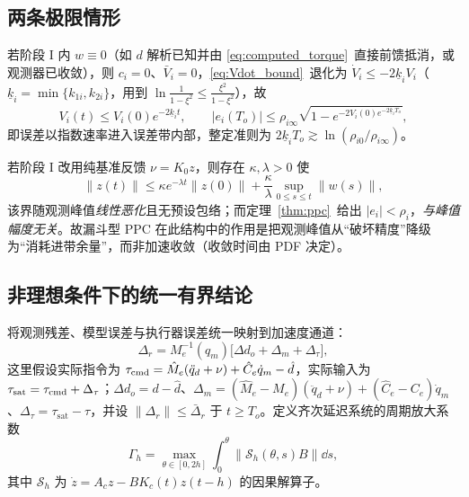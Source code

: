 \subsection{两条极限情形}
\label{sec:limits}

\begin{corollary}[无残差情形的定量贴合率]\label{cor:exponential}
若阶段 I 内 \(w\equiv0\)（如 \(d\) 解析已知并由 \eqref{eq:computed_torque}~直接前馈抵消，或观测器已收敛），则 \(c_i=0\)、\(\bar V_i=0\)，\eqref{eq:Vdot_bound}~退化为 \(\dot V_i\le-2\underline k_iV_i\)（\(\underline k_i=\min\{k_{1i},k_{2i}\}\)，用到 \(\ln\frac{1}{1-\xi^2}\le\frac{\xi^2}{1-\xi^2}\)），故
\begin{equation}
V_i(t)\le V_i(0)e^{-2\underline k_it},\qquad
\lvert e_i(T_o)\rvert\le\rho_{i\infty}\sqrt{1-e^{-2V_i(0)e^{-2\underline k_iT_o}}} ,
\label{eq:exp_funnel}
\end{equation}
即误差以指数速率进入误差带内部，整定准则为 \(2\underline k_iT_o\gtrsim\ln(\rho_{i0}/\rho_{i\infty})\)。
\end{corollary}

\begin{corollary}[与纯 PD 阶段 I 的对照]\label{cor:pd_compare}
若阶段 I 改用纯基准反馈 \(\nu=K_0z\)，则存在 \(\kappa,\lambda>0\) 使
\begin{equation}
\lVert z(t)\rVert\le\kappa e^{-\lambda t}\lVert z(0)\rVert+\frac{\kappa}{\lambda}\sup_{0\le s\le t}\lVert w(s)\rVert ,
\label{eq:pd_bound}
\end{equation}
该界随观测峰值\emph{线性恶化}且无预设包络；而定理~\ref{thm:ppc}~给出 \(\lvert e_i\rvert<\rho_i\)，\emph{与峰值幅度无关}。故漏斗型 PPC 在此结构中的作用是把观测峰值从“破坏精度”降级为“消耗进带余量”，而非加速收敛（收敛时间由 PDF 决定）。
\end{corollary}

\subsection{非理想条件下的统一有界结论}
\label{sec:practical}

将观测残差、模型误差与执行器误差统一映射到加速度通道：
\begin{equation}
\Delta_r=M_e^{-1}(q_m)\bigl[\Delta d_o+\Delta_m+\Delta_\tau\bigr],
\label{eq:residual_lumped}
\end{equation}
这里假设实际指令为 \(\tau_{\rm cmd}=\hat M_e(\ddot q_d+\nu)+\hat C_e\dot q_m-\hat d\)，实际输入为 \(\tau_{\rm sat}=\tau_{\rm cmd}+\Delta_\tau\)；\(\Delta d_o=d-\hat d\)、\(\Delta_m=(\hat M_e-M_e)(\ddot q_d+\nu)+(\hat C_e-C_e)\dot q_m\)、\(\Delta_\tau=\tau_{\mathrm{sat}}-\tau\)，并设 \(\lVert\Delta_r\rVert\le\bar\Delta_r\) 于 \(t\ge T_o\)。定义齐次延迟系统的周期放大系数
\begin{equation}
\Gamma_h=\max_{\theta\in[0,2h]}\int_0^{\theta}\bigl\lVert\mathcal S_h(\theta,s)B\bigr\rVert\dd s,
\label{eq:Gamma_h}
\end{equation}
其中 \(\mathcal S_h\) 为 \(\dot z=A_cz-BK_c(t)z(t-h)\) 的因果解算子。

